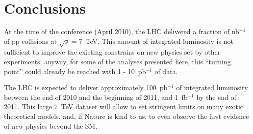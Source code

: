 \documentclass{cmspaper}
\begin{document}
\section{Conclusions}
At the time of the conference (April 2010), the LHC delivered a fraction of nb$^{-1}$ 
of pp collisions at $\sqrt{s} = 7$~TeV. 
This amount of integrated luminosity is not  
sufficient to improve the existing constrains on new physics set by other experiments; 
anyway, for some of the analyses presented here, this ``turning point'' could 
already be reached with 1 - 10~pb$^{-1}$ of data.

The LHC is expected to deliver approximately 100~pb$^{-1}$ of integrated luminosity 
between the end of 2010 and the beginning of 2011, and 1~fb$^{-1}$ by the end of 2011. 
This large $7$~TeV dataset will allow to set stringent limits 
on many exotic theoretical models, and, if Nature is kind to us, 
to even observe the first evidence of new physics beyond the SM.

\end{document}
